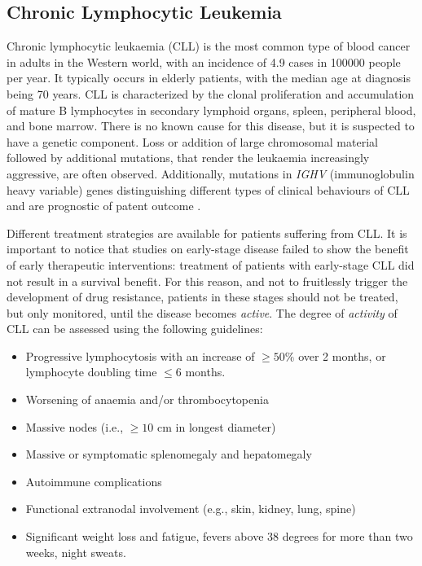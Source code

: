 \subsection{Chronic Lymphocytic Leukemia}
Chronic lymphocytic leukaemia (CLL) is the most common type of blood cancer in adults in the Western world, with an incidence of 4.9 cases in 100000 people per year. It typically occurs in elderly patients, with the median age at diagnosis being 70 years. CLL is characterized by the clonal proliferation and accumulation of mature B lymphocytes in secondary lymphoid organs, spleen, peripheral blood, and bone marrow. \cite{cll-burger-med, cll-rozman-med}  There is no known cause for this disease, but it is suspected to have a genetic component. Loss or addition of large chromosomal material followed by additional mutations, that render the leukaemia increasingly aggressive, are often observed. Additionally, mutations in \textit{IGHV} (immunoglobulin heavy variable) genes distinguishing different types of clinical behaviours of CLL and are prognostic of patent outcome \cite{immunogl-med}. \par
\vspace{0.4cm}
Different treatment strategies are available for patients suffering from CLL. It is important to notice that studies on early-stage disease failed to show the benefit of early therapeutic interventions: treatment of patients with early-stage CLL did not result in a survival benefit. For this reason, and not to fruitlessly trigger the development of drug resistance, patients in these stages should not be treated, but only monitored, until the disease becomes \textit{active}. The degree of \textit{activity} of CLL can be assessed using the following guidelines:
\begin{itemize}
    \item Progressive lymphocytosis with an increase of $\geq 50 \%$ over 2 months, or lymphocyte doubling time $\leq 6$ months.
    \item Worsening of anaemia and/or thrombocytopenia
    \item Massive nodes (i.e., $\geq 10$ cm in longest diameter)
    \item Massive or symptomatic splenomegaly and hepatomegaly
    \item Autoimmune complications
    \item Functional extranodal involvement (e.g., skin, kidney, lung, spine)
    \item Significant weight loss and fatigue, fevers above 38 degrees for more than two weeks, night sweats. 
\end{itemize}
